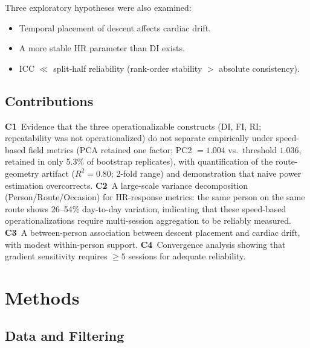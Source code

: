\documentclass[times, twoside]{zHenriquesLab-StyleBioRxiv}
\begin{document}
Three exploratory hypotheses were also examined:
\begin{itemize}
  \item[\textbf{E1}] Temporal placement of descent affects cardiac drift.
  \item[\textbf{E2}] A more stable HR parameter than DI exists.
  \item[\textbf{E3}] ICC $\ll$ split-half reliability (rank-order stability $>$ absolute consistency).
\end{itemize}

\subsection*{Contributions}

\textbf{C1}~Evidence that the three operationalizable constructs (DI, FI, RI; repeatability was not operationalized) do not separate empirically under speed-based field metrics (PCA retained one factor; PC2 $= 1.004$ vs.\ threshold $1.036$, retained in only 5.3\% of bootstrap replicates), with quantification of the route-geometry artifact ($R^2 = 0.80$; 2-fold range) and demonstration that naive power estimation overcorrects. \textbf{C2}~A large-scale variance decomposition (Person/Route/Occasion) for HR-response metrics: the same person on the same route shows 26--54\% day-to-day variation, indicating that these speed-based operationalizations require multi-session aggregation to be reliably measured. \textbf{C3}~A between-person association between descent placement and cardiac drift, with modest within-person support. \textbf{C4}~Convergence analysis showing that gradient sensitivity requires $\geq 5$ sessions for adequate reliability.


\section*{Methods}

\subsection*{Data and Filtering}
\end{document}

